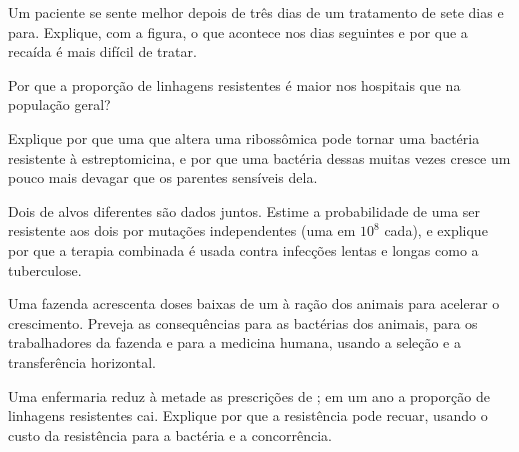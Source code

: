 \begin{exercise}[$\star\star$]\label{exo:g11:antibiotic-resistance:9}
Um paciente se sente melhor depois de três dias de um tratamento de
sete dias e para. Explique, com a figura, o que acontece nos dias
seguintes e por que a recaída é mais difícil de tratar.
\end{exercise}

\begin{exercise}[$\star\star$]\label{exo:g11:antibiotic-resistance:10}
Por que a proporção de linhagens resistentes é maior nos hospitais que
na população geral?
\end{exercise}

\begin{exercise}[$\star\star$]\label{exo:g11:antibiotic-resistance:11}
Explique por que uma  que altera uma  ribossômica pode
tornar uma bactéria resistente à estreptomicina, e por que uma bactéria
dessas muitas vezes cresce um pouco mais devagar que os parentes
sensíveis dela.
\end{exercise}

\begin{exercise}[$\star\star\star$]\label{exo:g11:antibiotic-resistance:12}
Dois  de alvos diferentes são dados juntos. Estime a
probabilidade de uma  ser resistente aos dois por mutações
independentes (uma em $10^8$ cada), e explique por que a terapia
combinada é usada contra infecções lentas e longas como a tuberculose.
\end{exercise}

\begin{exercise}[$\star\star\star$]\label{exo:g11:antibiotic-resistance:13}
Uma fazenda acrescenta doses baixas de um  à ração dos
animais para acelerar o crescimento. Preveja as consequências para as
bactérias dos animais, para os trabalhadores da fazenda e para a
medicina humana, usando a seleção e a transferência horizontal.
\end{exercise}

\begin{exercise}[$\star\star\star$]\label{exo:g11:antibiotic-resistance:14}
Uma enfermaria reduz à metade as prescrições de ; em um ano
a proporção de linhagens resistentes cai. Explique por que a
resistência pode recuar, usando o custo da resistência para a bactéria
e a concorrência.
\end{exercise}

